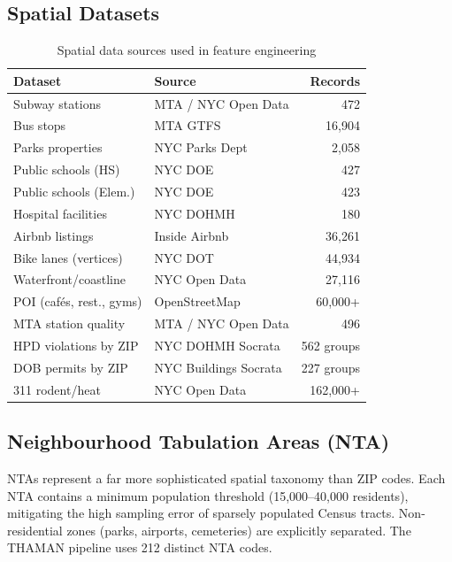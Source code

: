\documentclass[11pt, a4paper, twoside]{article}
\begin{document}
\subsection{Spatial Datasets}

\begin{table}[H]
  \centering
  \caption{Spatial data sources used in feature engineering}
  \label{tab:spatial_sources}
  \begin{tabular}{llr}
    \toprule
    Dataset & Source & Records \\
    \midrule
    Subway stations         & MTA / NYC Open Data     &    472 \\
    Bus stops               & MTA GTFS                & 16,904 \\
    Parks properties        & NYC Parks Dept          &  2,058 \\
    Public schools (HS)     & NYC DOE                 &    427 \\
    Public schools (Elem.)  & NYC DOE                 &    423 \\
    Hospital facilities     & NYC DOHMH               &    180 \\
    Airbnb listings         & Inside Airbnb           & 36,261 \\
    Bike lanes (vertices)   & NYC DOT                 & 44,934 \\
    Waterfront/coastline    & NYC Open Data           & 27,116 \\
    POI (cafés, rest., gyms)& OpenStreetMap           & 60,000+ \\
    MTA station quality     & MTA / NYC Open Data     &    496 \\
    HPD violations by ZIP   & NYC DOHMH Socrata       &    562 groups \\
    DOB permits by ZIP      & NYC Buildings Socrata   &    227 groups \\
    311 rodent/heat         & NYC Open Data           & 162,000+ \\
    \bottomrule
  \end{tabular}
\end{table}

\subsection{Neighbourhood Tabulation Areas (NTA)}
NTAs represent a far more sophisticated spatial taxonomy than ZIP codes. Each
NTA contains a minimum population threshold (15,000--40,000 residents),
mitigating the high sampling error of sparsely populated Census tracts.
Non-residential zones (parks, airports, cemeteries) are explicitly separated.
The THAMAN pipeline uses 212 distinct NTA codes.
\end{document}
